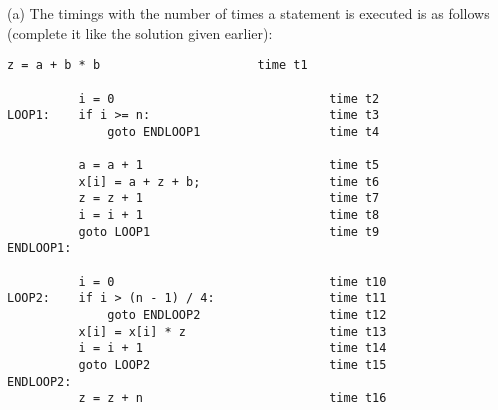 
(a) The timings with the number of times a statement is executed
is as follows (complete it like the solution given earlier):
\begin{Verbatim}[frame=single]
          z = a + b * b                      time t1

          i = 0                              time t2
LOOP1:    if i >= n:                         time t3
              goto ENDLOOP1                  time t4
 
          a = a + 1                          time t5
          x[i] = a + z + b;                  time t6
          z = z + 1                          time t7
          i = i + 1                          time t8
          goto LOOP1                         time t9
ENDLOOP1:

          i = 0                              time t10
LOOP2:    if i > (n - 1) / 4:                time t11
              goto ENDLOOP2                  time t12
          x[i] = x[i] * z                    time t13
          i = i + 1                          time t14
          goto LOOP2                         time t15
ENDLOOP2:
          z = z + n                          time t16   
\end{Verbatim}


